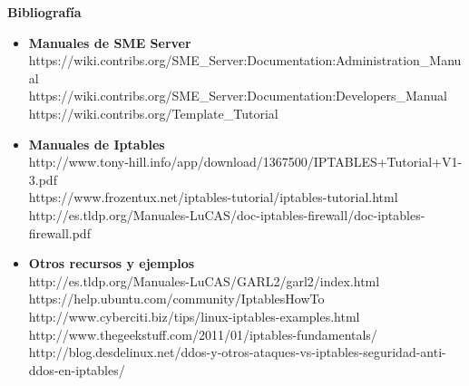 \newpage
\thispagestyle{plain}
\begin{center}
\Huge
\textbf{Bibliografía}
\end{center}\vspace{0.3cm}

\begin{itemize}
\item \textbf{Manuales de SME Server}\\
https://wiki.contribs.org/SME\_Server:Documentation:Administration\_Manual\\
https://wiki.contribs.org/SME\_Server:Documentation:Developers\_Manual\\
https://wiki.contribs.org/Template\_Tutorial\\

\item \textbf{Manuales de Iptables}\\
http://www.tony-hill.info/app/download/1367500/IPTABLES+Tutorial+V1-3.pdf\\
https://www.frozentux.net/iptables-tutorial/iptables-tutorial.html\\
http://es.tldp.org/Manuales-LuCAS/doc-iptables-firewall/doc-iptables-firewall.pdf\\

\item \textbf{Otros recursos y ejemplos}\\
http://es.tldp.org/Manuales-LuCAS/GARL2/garl2/index.html\\
https://help.ubuntu.com/community/IptablesHowTo\\
http://www.cyberciti.biz/tips/linux-iptables-examples.html\\
http://www.thegeekstuff.com/2011/01/iptables-fundamentals/\\
http://blog.desdelinux.net/ddos-y-otros-ataques-vs-iptables-seguridad-anti-ddos-en-iptables/
\end{itemize}

